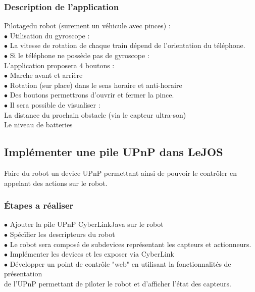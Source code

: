 \documentclass[10pt,a4paper]{article}
\begin{document}
			\subsubsection{Description de l'application}
				\begin{tabbing}
				Pilo\=tage\= du \=robot (surement un véhicule avec pinces) :\\
				\>	$ \bullet $ Utilisation du gyroscope :\\
				\>	$ \bullet $ La vitesse de rotation de chaque train dépend de l'orientation du téléphone.\\
				\>	$ \bullet $ Si le téléphone ne possède pas de gyroscope :\\
						\>\>L'application proposera 4 boutons :\\
						\>\>\>	$ \bullet $ Marche avant et arrière\\
						\>\>\>	$ \bullet $ Rotation (sur place) dans le sens horaire et anti-horaire\\
				\>	$ \bullet $ Des boutons permettrons d'ouvrir et fermer la pince.\\
				\>	$ \bullet $ Il sera possible de visualiser :\\
				\>\>		La distance du prochain obstacle (via le capteur ultra-son)\\
				\>\>		Le niveau de batteries\\
				\end{tabbing}
		\subsection{Implémenter une pile UPnP dans LeJOS}
			Faire du robot un device UPnP permettant ainsi de pouvoir le contr\^oler en appelant des actions sur le robot.
			\subsubsection{Étapes a réaliser}
			\begin{tabbing}
			$ \bullet $	Ajouter la pile UPnP CyberLinkJava sur le robot\\
			$ \bullet $	Spéc\=ifier les descripteurs du robot\\
			\>$ \bullet $	Le robot sera composé de subdevices représentant les capteurs et actionneurs.\\
			$ \bullet $ Implémenter les devices et les exposer via CyberLink\\
			$ \bullet $ Développer un point de contrôle "web" en utilisant la fonctionnalités de présentation \\ de l'UPnP permettant de piloter le robot et d'afficher l'état des capteurs.\\
			\end{tabbing}
\end{document}
